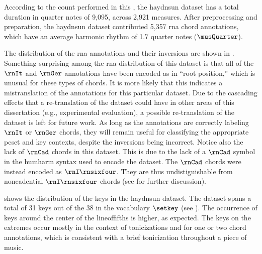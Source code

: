 
According to the count performed in this \thesisdiss{}, the
\gls{haydnsun} dataset has a total duration in quarter notes
of 9,095, across 2,921 measures. After preprocessing and
preparation, the \gls{haydnsun} dataset contributed 5,357
\gls{rna} chord annotations, which have an average harmonic
rhythm of 1.7 quarter notes ($\musQuarter$).

The distribution of the \gls{rna} annotations and their
inversions are shown in .
Something surprising among the \gls{rna} distribution of
this dataset is that all of the $\rnIt$ and $\rnGer$
annotations have been encoded as in ``root position,'' which
is unusual for these types of chords. It is more likely that
this indicates a mistranslation of the annotations for this
particular dataset. Due to the cascading effects that a
re-translation of the dataset could have in other areas of
this dissertation (e.g., experimental evaluation), a
possible re-translation of the dataset is left for future
work. As long as the annotations are correctly labeling
$\rnIt$ or $\rnGer$ chords, they will remain useful for
classifying the appropriate \gls{pcset} and key contexts,
despite the inversions being incorrect. Notice also the lack
of $\rnCad$ chords in this dataset. This is due to the lack
of a $\rnCad$ symbol in the \gls{humharm} syntax used to
encode the dataset. The $\rnCad$ chords were instead
encoded as $\rnI\rnsixfour$. They are thus undistiguishable
from noncadential $\rnI\rnsixfour$ chords (see
 for
further discussion). 



 shows the distribution of the
keys in the \gls{haydnsun} dataset. The dataset spans a
total of 31 keys out of the 38 in the vocabulary $\setkey$
(see ). The occurrence of
keys around the center of the \gls{lineoffifths} is higher,
as expected. The keys on the extremes occur mostly in the
context of tonicizations and for one or two chord
annotations, which is consistent with a brief tonicization
throughout a piece of music.

